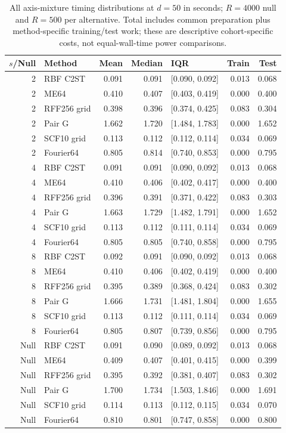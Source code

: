 \begin{table}[t]\centering\scriptsize
\caption{All axis-mixture timing distributions at $d=50$ in seconds; $R=4000$ null and $R=500$ per alternative. Total includes common preparation plus method-specific training/test work; these are descriptive cohort-specific costs, not equal-wall-time power comparisons.}
\label{tab:axis-runtime-d50}
{\setlength{\tabcolsep}{8pt}\renewcommand{\arraystretch}{1.2}
\begin{tabular}{rlrrlrr}
\toprule
$s$/Null & Method & Mean & Median & IQR & Train & Test\\
\midrule
2 & RBF C2ST & 0.091 & 0.091 & [0.090, 0.092] & 0.013 & 0.068\\
2 & ME64 & 0.410 & 0.407 & [0.403, 0.419] & 0.000 & 0.400\\
2 & RFF256 grid & 0.398 & 0.396 & [0.374, 0.425] & 0.083 & 0.304\\
2 & Pair G & 1.662 & 1.720 & [1.484, 1.783] & 0.000 & 1.652\\
2 & SCF10 grid & 0.113 & 0.112 & [0.112, 0.114] & 0.034 & 0.069\\
2 & Fourier64 & 0.805 & 0.814 & [0.740, 0.853] & 0.000 & 0.795\\
4 & RBF C2ST & 0.091 & 0.091 & [0.090, 0.092] & 0.013 & 0.068\\
4 & ME64 & 0.410 & 0.406 & [0.402, 0.417] & 0.000 & 0.400\\
4 & RFF256 grid & 0.396 & 0.391 & [0.371, 0.422] & 0.083 & 0.303\\
4 & Pair G & 1.663 & 1.729 & [1.482, 1.791] & 0.000 & 1.652\\
4 & SCF10 grid & 0.113 & 0.112 & [0.111, 0.114] & 0.034 & 0.069\\
4 & Fourier64 & 0.805 & 0.805 & [0.740, 0.858] & 0.000 & 0.795\\
8 & RBF C2ST & 0.092 & 0.091 & [0.090, 0.092] & 0.013 & 0.068\\
8 & ME64 & 0.410 & 0.406 & [0.402, 0.419] & 0.000 & 0.400\\
8 & RFF256 grid & 0.395 & 0.389 & [0.368, 0.424] & 0.083 & 0.302\\
8 & Pair G & 1.666 & 1.731 & [1.481, 1.804] & 0.000 & 1.655\\
8 & SCF10 grid & 0.113 & 0.112 & [0.111, 0.114] & 0.034 & 0.069\\
8 & Fourier64 & 0.805 & 0.807 & [0.739, 0.856] & 0.000 & 0.795\\
Null & RBF C2ST & 0.091 & 0.090 & [0.089, 0.092] & 0.013 & 0.068\\
Null & ME64 & 0.409 & 0.407 & [0.401, 0.415] & 0.000 & 0.399\\
Null & RFF256 grid & 0.395 & 0.392 & [0.381, 0.407] & 0.083 & 0.302\\
Null & Pair G & 1.700 & 1.734 & [1.503, 1.846] & 0.000 & 1.691\\
Null & SCF10 grid & 0.114 & 0.113 & [0.112, 0.115] & 0.034 & 0.070\\
Null & Fourier64 & 0.810 & 0.801 & [0.747, 0.858] & 0.000 & 0.800\\
\bottomrule
\end{tabular}}
\end{table}
